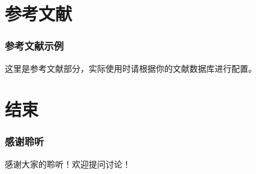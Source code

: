 \documentclass[aspectratio=169]{beamer}
\begin{document}
\section{参考文献}
\begin{frame}[allowframebreaks]
    \frametitle{参考文献示例}
    这里是参考文献部分，实际使用时请根据你的文献数据库进行配置。
\end{frame}

\section{结束}
\begin{frame}
    \frametitle{感谢聆听}
    感谢大家的聆听！欢迎提问讨论！
\end{frame}
\end{document}
